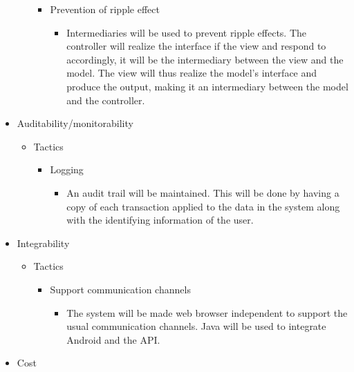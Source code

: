 \documentclass[a4paper,12pt]{article}
\begin{document}
\begin{itemize}
\begin{itemize}
\begin{itemize}
				\item Prevention of ripple effect 
				
					\begin{itemize}
						\item Intermediaries will be used to prevent ripple effects. The controller will realize the interface if the view and respond to accordingly, it will be the intermediary between the view and the model. The view will thus realize the model's interface and produce the output, making it an intermediary between the model and the controller.
					\end{itemize}

			\end{itemize}			
			
		\end{itemize}
		\item Auditability/monitorability
		\begin{itemize}
			
			\item Tactics
			\begin{itemize}
				\item Logging
					\begin{itemize}
						\item An audit trail will be maintained. This will be done by having a copy of each transaction applied to the data in the system along with the identifying information of the user.
					\end{itemize}					
			\end{itemize}			
			
		\end{itemize}
		\item Integrability
		\begin{itemize}

			
			\item Tactics
			\begin{itemize}
				
				\item Support communication channels
					\begin{itemize}
						\item The system will be made web browser independent to support the usual communication channels. Java will be used to integrate Android and the API.
					\end{itemize}
			\end{itemize}			
		
			
		\end{itemize}
		\item Cost
		\begin{itemize}
			

\end{itemize}
\end{itemize}
\end{document}
